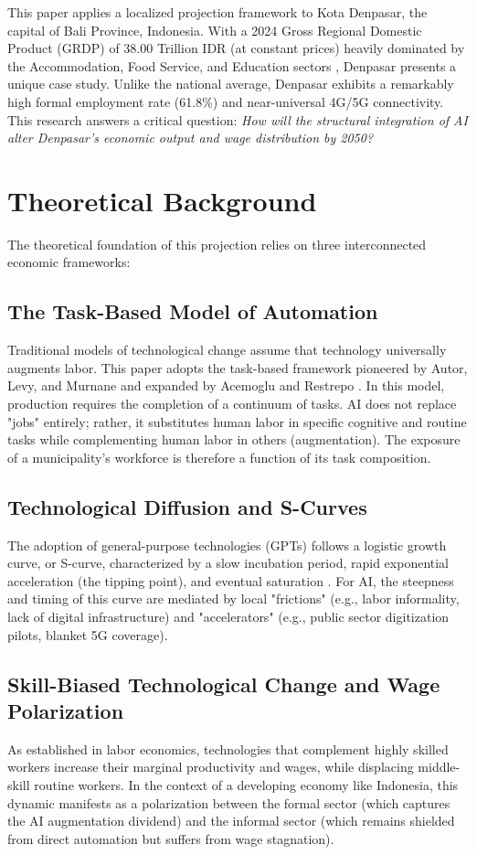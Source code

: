 \documentclass[11pt, a4paper, twocolumn]{article}
\begin{document}
This paper applies a localized projection framework to Kota Denpasar, the capital of Bali Province, Indonesia. With a 2024 Gross Regional Domestic Product (GRDP) of 38.00 Trillion IDR (at constant prices) heavily dominated by the Accommodation, Food Service, and Education sectors \cite{bps2025_pdrb}, Denpasar presents a unique case study. Unlike the national average, Denpasar exhibits a remarkably high formal employment rate (61.8\%) and near-universal 4G/5G connectivity. This research answers a critical question: \textit{How will the structural integration of AI alter Denpasar's economic output and wage distribution by 2050?}

\section*{Theoretical Background}
The theoretical foundation of this projection relies on three interconnected economic frameworks:

\subsection*{The Task-Based Model of Automation}
Traditional models of technological change assume that technology universally augments labor. This paper adopts the task-based framework pioneered by Autor, Levy, and Murnane \cite{autor2003} and expanded by Acemoglu and Restrepo \cite{acemoglu2018}. In this model, production requires the completion of a continuum of tasks. AI does not replace "jobs" entirely; rather, it substitutes human labor in specific cognitive and routine tasks while complementing human labor in others (augmentation). The exposure of a municipality's workforce is therefore a function of its task composition.
  
\subsection*{Technological Diffusion and S-Curves}
The adoption of general-purpose technologies (GPTs) follows a logistic growth curve, or S-curve, characterized by a slow incubation period, rapid exponential acceleration (the tipping point), and eventual saturation \cite{griliches1957}. For AI, the steepness and timing of this curve are mediated by local "frictions" (e.g., labor informality, lack of digital infrastructure) and "accelerators" (e.g., public sector digitization pilots, blanket 5G coverage).
  
\subsection*{Skill-Biased Technological Change and Wage Polarization}
As established in labor economics, technologies that complement highly skilled workers increase their marginal productivity and wages, while displacing middle-skill routine workers. In the context of a developing economy like Indonesia, this dynamic manifests as a polarization between the formal sector (which captures the AI augmentation dividend) and the informal sector (which remains shielded from direct automation but suffers from wage stagnation).
  
\end{document}
